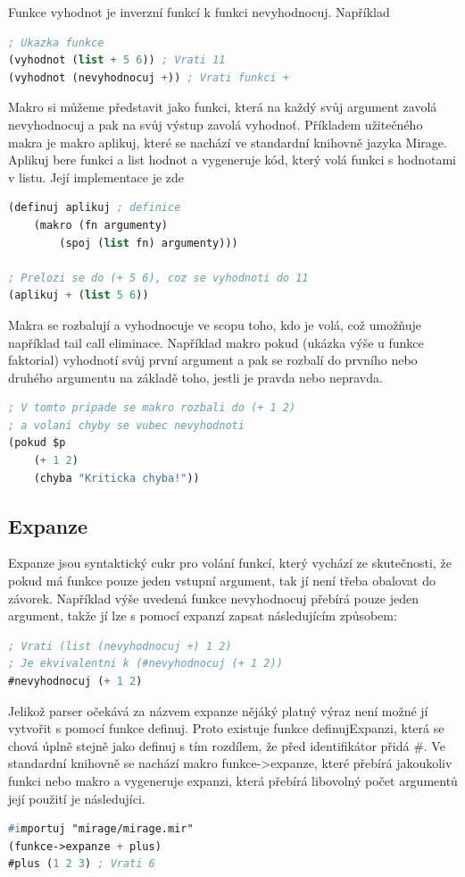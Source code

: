 \documentclass[a4paper,11pt]{article}
\begin{document}
Funkce vyhodnot je inverzní funkcí k funkci nevyhodnocuj. Například

\begin{lstlisting}[language=lisp]
; Ukazka funkce
(vyhodnot (list + 5 6)) ; Vrati 11
(vyhodnot (nevyhodnocuj +)) ; Vrati funkci +
\end{lstlisting}

Makro si můžeme představit jako funkci, která na každý svůj argument zavolá nevyhodnocuj a pak na svůj výstup zavolá vyhodnoť. Příkladem užitečného makra je makro aplikuj, které se nachází ve standardní knihovně jazyka Mirage. Aplikuj bere funkci a list hodnot a vygeneruje kód, který volá funkci s hodnotami v listu. Její implementace je zde

\begin{lstlisting}[language=lisp]
(definuj aplikuj ; definice
	(makro (fn argumenty)
		(spoj (list fn) argumenty)))
		
; Prelozi se do (+ 5 6), coz se vyhodnoti do 11
(aplikuj + (list 5 6)) 
\end{lstlisting}

Makra se rozbalují a vyhodnocuje ve scopu toho, kdo je volá, což umožňuje například tail call eliminace. Například makro pokud (ukázka výše u funkce faktorial) vyhodnotí svůj první argument a pak se rozbalí do prvního nebo druhého argumentu na základě toho, jestli je pravda nebo nepravda.

\begin{lstlisting}[language=lisp]
; V tomto pripade se makro rozbali do (+ 1 2)
; a volani chyby se vubec nevyhodnoti
(pokud $p
	(+ 1 2)
	(chyba "Kriticka chyba!"))
\end{lstlisting}

\subsection{Expanze}
Expanze jsou syntaktický cukr pro volání funkcí, který vychází ze skutečnosti, že pokud má funkce pouze jeden vstupní argument, tak jí není třeba obalovat do závorek. Například výše uvedená funkce nevyhodnocuj přebírá pouze jeden argument, takže jí lze s pomocí expanzí zapsat následujícím způsobem:
\begin{lstlisting}[language=lisp]
; Vrati (list (nevyhodnocuj +) 1 2)
; Je ekvivalentni k (#nevyhodnocuj (+ 1 2))
#nevyhodnocuj (+ 1 2) 
\end{lstlisting}
Jelikož parser očekává za názvem expanze nějáký platný výraz není možné jí vytvořit s pomocí funkce definuj. Proto existuje funkce definujExpanzi, která se chová úplně stejně jako definuj s tím rozdílem, že před identifikátor přidá \#. Ve standardní knihovně se nachází makro funkce->expanze, které přebírá jakoukoliv funkci nebo makro a vygeneruje expanzi, která přebírá libovolný počet argumentů její použití je následujíci.
\begin{lstlisting}[language=lisp]
#importuj "mirage/mirage.mir"
(funkce->expanze + plus)
#plus (1 2 3) ; Vrati 6
\end{lstlisting}
\end{document}
